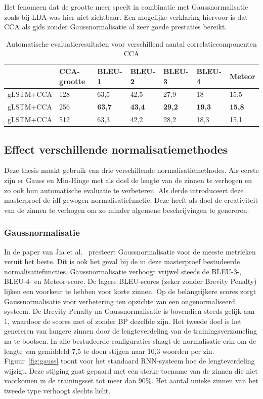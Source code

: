Het fenomeen dat de grootte meer speelt in combinatie met Gaussnormalisatie zoals bij LDA was hier niet zichtbaar. Een mogelijke verklaring hiervoor is dat CCA als gids zonder Gaussnormalisatie al zeer goede prestaties bereikt.
\begin{table}
	\centering
	\begin{tabular}{lllllll}
		~              & CCA-grootte     & BLEU-1 & BLEU-2 & BLEU-3 & BLEU-4 & Meteor \\ \hline
		gLSTM+CCA & 128        & 63,5   & 42,5 			& 27,9   & 18   & 15,5  \\
		gLSTM+CCA & 256        & \textbf{63,7}   & \textbf{43,4}   & \textbf{29,2}   & \textbf{19,3}   & \textbf{15,8}  \\
		gLSTM+CCA & 512        & 63,3   & 42,2   & 28,2   & 18,3 & 15,1  \\ \hline
	
	\end{tabular}

	\caption{Automatische evaluatieresultaten voor verschillend aantal correlatiecomponenten CCA}
		\label{table:results_cca}
\end{table}



\subsection{Effect verschillende normalisatiemethodes}
Deze thesis maakt gebruik van drie verschillende normalisatiemethodes. Als eerste zijn er Gauss en Min-Hinge met als doel de lengte van de zinnen te verhogen en zo ook hun automatische evaluatie te verbeteren. Als derde introduceert deze masterproef de idf-gewogen normalisatiefunctie. Deze heeft als doel de creativiteit van de zinnen te verhogen om zo minder algemene beschrijvingen te genereren.

\subsubsection{Gaussnormalisatie}
In de paper van Jia et al.~\cite{Fernando2015} presteert Gaussnormalisatie voor de meeste metrieken veruit het beste. 
Dit is ook het geval bij de in deze masterproef bestudeerde normalisatiefuncties. Gaussnormalisatie verhoogt vrijwel steeds de BLEU-3-, BLEU-4- en Meteor-score. De lagere BLEU-scores (zeker zonder Brevity Penalty) lijken een voorkeur te hebben voor korte zinnen. Op de belangrijkere scores zorgt Gaussnormalisatie voor verbetering ten opzichte van een ongenormaliseerd systeem. De Brevity Penalty na Gaussnormalisatie is bovendien steeds gelijk aan 1, waardoor de scores met of zonder BP dezelfde zijn.
Het tweede doel is het genereren van langere zinnen door de lengteverdeling van de trainingsverzameling na te bootsen.
In alle bestudeerde configuraties slaagt de normalisatie erin om de lengte van gemiddeld 7,5 te doen stijgen naar 10,3 woorden per zin. Figuur~\ref{fig:gauss} toont voor het standaard RNN-systeem hoe de lengteverdeling wijzigt. Deze stijging gaat gepaard met een sterke toename van de zinnen die niet voorkomen in de trainingsset tot meer dan 90\%. Het aantal unieke zinnen van het tweede type verhoogt slechts licht. 

